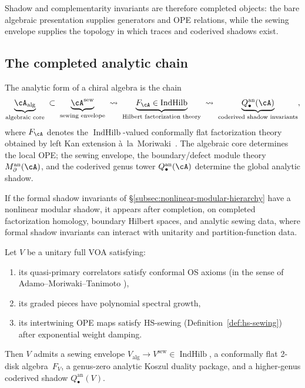 Shadow and complementarity invariants are therefore completed
objects: the bare algebraic presentation supplies generators and OPE
relations, while the sewing envelope supplies the topology in which
traces and coderived shadows exist.

\subsection{The completed analytic chain}%
\label{subsec:platonic-chain}

\begin{remark}%
\label{rem:platonic-ideal-form}%
%
The analytic form of a chiral algebra is the chain
\begin{equation}\label{eq:platonic-chain}
\underbrace{\cA_{\mathrm{alg}}}_{\text{algebraic core}}
\;\subset\;
\underbrace{\cA^{\mathrm{sew}}}_{\text{sewing envelope}}
\;\rightsquigarrow\;
\underbrace{F_\cA \in
\operatorname{IndHilb}}_{\text{Hilbert factorization theory}}
\;\rightsquigarrow\;
\underbrace{Q_\bullet^{\mathrm{an}}(\cA)}_{\text{coderived shadow
invariants}},
\end{equation}
where $F_\cA$ denotes the $\operatorname{IndHilb}$-valued conformally
flat factorization theory obtained by left Kan extension
\`a~la~Moriwaki~\cite{Moriwaki26a}. The algebraic core determines the
local OPE; the sewing envelope, the boundary/defect module theory
$M_\partial^{\mathrm{an}}(\cA)$, and the coderived genus tower
$Q_\bullet^{\mathrm{an}}(\cA)$ determine the global analytic shadow.

If the formal shadow invariants of
\S\ref{subsec:nonlinear-modular-hierarchy} have a
nonlinear modular shadow, it appears after completion, on
completed factorization homology, boundary Hilbert spaces, and
analytic sewing data, where formal shadow invariants can interact
with unitarity and partition-function data.
\end{remark}

\begin{conjecture}\label{conj:analytic-realization}%
%
Let $V$ be a unitary full VOA satisfying:
\begin{enumerate}[label=\textup{(\roman*)}]
\item its quasi-primary correlators satisfy conformal OS axioms
 \textup{(}in the sense of Adamo--Moriwaki--Tanimoto
 \cite{AMT24}\textup{)},
\item its graded pieces have polynomial spectral growth,
\item its intertwining OPE maps satisfy HS-sewing
 \textup{(}Definition~\textup{\ref{def:hs-sewing}}\textup{)}
 after exponential weight damping.
\end{enumerate}
Then $V$ admits a sewing envelope
$V_{\mathrm{alg}} \to V^{\mathrm{sew}} \in
\operatorname{IndHilb}$, a conformally flat 2-disk algebra~$F_V$, a
genus-zero analytic Koszul duality package, and a higher-genus
coderived shadow $Q_\bullet^{\mathrm{an}}(V)$.
\end{conjecture}

